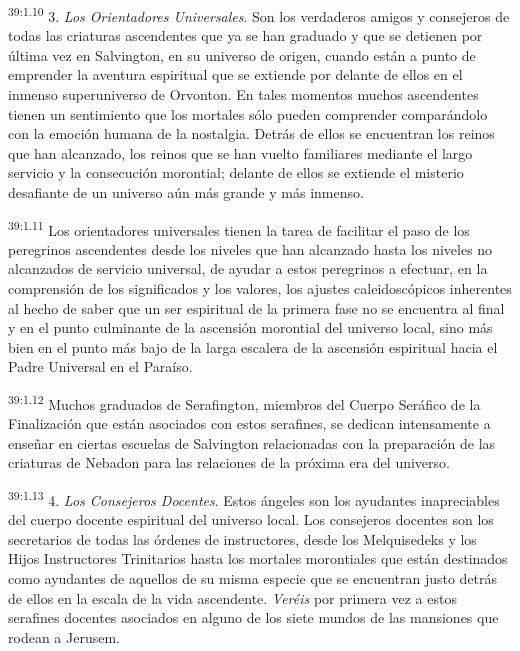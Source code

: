 \par
\textsuperscript{39:1.10} 3. \textit{Los Orientadores Universales}. Son los verdaderos amigos y consejeros de todas las criaturas ascendentes que ya se han graduado y que se detienen por última vez en Salvington, en su universo de origen, cuando están a punto de emprender la aventura espiritual que se extiende por delante de ellos en el inmenso superuniverso de Orvonton. En tales momentos muchos ascendentes tienen un sentimiento que los mortales sólo pueden comprender comparándolo con la emoción humana de la nostalgia. Detrás de ellos se encuentran los reinos que han alcanzado, los reinos que se han vuelto familiares mediante el largo servicio y la consecución morontial; delante de ellos se extiende el misterio desafiante de un universo aún más grande y más inmenso.

\par
\textsuperscript{39:1.11} Los orientadores universales tienen la tarea de facilitar el paso de los peregrinos ascendentes desde los niveles que han alcanzado hasta los niveles no alcanzados de servicio universal, de ayudar a estos peregrinos a efectuar, en la comprensión de los significados y los valores, los ajustes caleidoscópicos inherentes al hecho de saber que un ser espiritual de la primera fase no se encuentra al final y en el punto culminante de la ascensión morontial del universo local, sino más bien en el punto más bajo de la larga escalera de la ascensión espiritual hacia el Padre Universal en el Paraíso.

\par
\textsuperscript{39:1.12} Muchos graduados de Serafington, miembros del Cuerpo Seráfico de la Finalización que están asociados con estos serafines, se dedican intensamente a enseñar en ciertas escuelas de Salvington relacionadas con la preparación de las criaturas de Nebadon para las relaciones de la próxima era del universo.

\par
\textsuperscript{39:1.13} 4. \textit{Los Consejeros Docentes}. Estos ángeles son los ayudantes inapreciables del cuerpo docente espiritual del universo local. Los consejeros docentes son los secretarios de todas las órdenes de instructores, desde los Melquisedeks y los Hijos Instructores Trinitarios hasta los mortales morontiales que están destinados como ayudantes de aquellos de su misma especie que se encuentran justo detrás de ellos en la escala de la vida ascendente. \textit{Veréis} por primera vez a estos serafines docentes asociados en alguno de los siete mundos de las mansiones que rodean a Jerusem.

